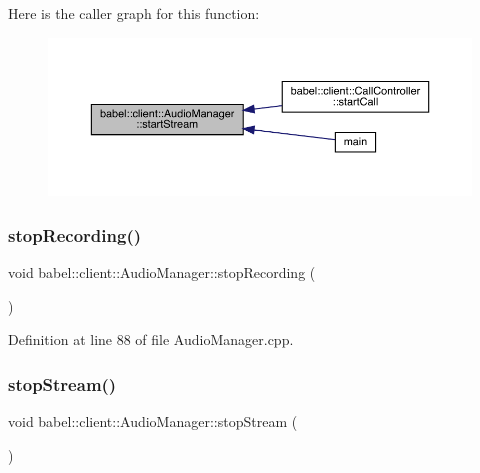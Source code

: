 Here is the caller graph for this function\+:\nopagebreak
\begin{figure}[H]
\begin{center}
\leavevmode
\includegraphics[width=350pt]{classbabel_1_1client_1_1_audio_manager_a2cea1058232cdce07789770bd1e4b268_icgraph}
\end{center}
\end{figure}
\mbox{\label{classbabel_1_1client_1_1_audio_manager_a8277b13d3973b567b9b052b6cb5c5235}} 
\subsubsection{\texorpdfstring{stop\+Recording()}{stopRecording()}}
{\footnotesize\ttfamily void babel\+::client\+::\+Audio\+Manager\+::stop\+Recording (\begin{DoxyParamCaption}{ }\end{DoxyParamCaption})}



Definition at line 88 of file Audio\+Manager.\+cpp.

\mbox{\label{classbabel_1_1client_1_1_audio_manager_abb1982693e6352b113cb42528f48ecf1}} 
\subsubsection{\texorpdfstring{stop\+Stream()}{stopStream()}}
{\footnotesize\ttfamily void babel\+::client\+::\+Audio\+Manager\+::stop\+Stream (\begin{DoxyParamCaption}{ }\end{DoxyParamCaption})}



